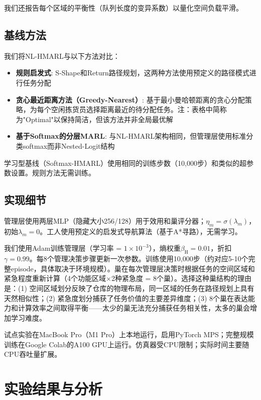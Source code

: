 \documentclass[12pt,a4paper]{article}
\begin{document}
我们还报告每个区域的平衡性（队列长度的变异系数）以量化空间负载平滑。

\subsection{基线方法}

我们将NL-HMARL与以下方法对比：
\begin{itemize}
\item \textbf{规则启发式}: S-Shape和Return路径规划，这两种方法使用预定义的路径模式进行任务分配
\item \textbf{贪心最近距离方法（Greedy-Nearest）}: 基于最小曼哈顿距离的贪心分配策略，为每个空闲拣货员选择距离最近的待分配任务。注：表格中简称为"Optimal"以保持简洁，但该方法并非全局最优解
\item \textbf{基于Softmax的分层MARL}: 与NL-HMARL架构相同，但管理层使用标准分类softmax而非Nested-Logit结构
\end{itemize}

学习型基线（Softmax-HMARL）使用相同的训练步数（10,000步）和类似的超参数设置。规则方法无需训练。

\subsection{实现细节}

管理层使用两层MLP（隐藏大小256/128）用于效用和巢评分器；$\eta_m = \sigma(\lambda_m)$，初始$\lambda_m = 0$。工人使用预定义的启发式导航算法（基于A*寻路），无需学习。

我们使用Adam训练管理层（学习率 = $1 \times 10^{-3}$），熵权重$\beta_{\mathrm{H}} = 0.01$，折扣$\gamma = 0.99$。每8个管理决策步骤更新一次参数。训练使用10,000步（约对应5-10个完整episode，具体取决于环境规模）。巢在每次管理层决策时根据任务的空间区域和紧急程度重新计算（4个功能区域$\times$2种紧急度 = 8个巢）。选择这种巢结构的理由是：(1) 空间区域划分反映了仓库的物理布局，同一区域的任务在路径规划上具有天然相似性；(2) 紧急度划分捕获了任务价值的主要差异维度；(3) 8个巢在表达能力和计算效率之间取得平衡——太少的巢无法充分捕获任务相关性，太多的巢会增加学习难度。

试点实验在MacBook Pro（M1 Pro）上本地运行，启用PyTorch MPS；完整规模训练在Google Colab的A100 GPU上运行。仿真器受CPU限制；实际时间主要随CPU吞吐量扩展。

\section{实验结果与分析}
\end{document}
